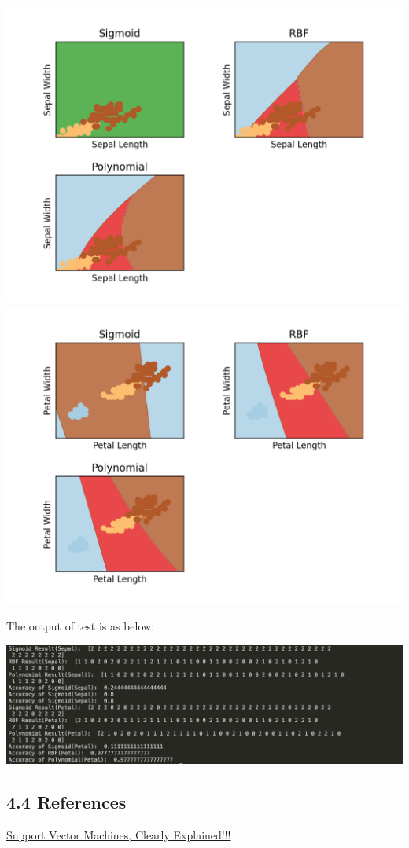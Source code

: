 \documentclass[12pt]{article}
\begin{document}
\begin{center}
    \includegraphics[scale=0.8]{fig/ec3.png}
    \includegraphics[scale=0.8]{fig/ec4.png}
\end{center}
The output of test is as below: 
\begin{center}
    \includegraphics[scale=0.6]{fig/ec_output.png}
\end{center}
\subsection*{4.4 References}
\href{https://www.youtube.com/watch?v=efR1C6CvhmE}{Support Vector Machines, Clearly Explained!!!}
\end{document}
